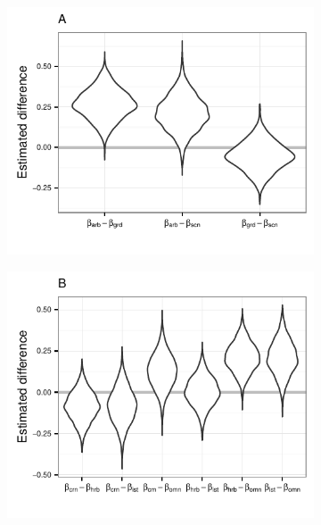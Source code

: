 \documentclass[12pt]{article}
\begin{document}
\begin{figure}[ht]
  \centering
  \begin{subfigure}[b]{0.4\textwidth}
    \caption{}
    \includegraphics[height = 0.5\textheight, width = \textwidth, keepaspectratio = true]{figure/loco_diff_est}
    \label{subfig:loco}
  \end{subfigure}
  \begin{subfigure}[b]{0.4\textwidth}
    \caption{}
    \includegraphics[height = 0.5\textheight, width = \textwidth, keepaspectratio = true]{figure/diet_diff_est}
    \label{subfig:diet}
  \end{subfigure}

\end{figure}
\end{document}
